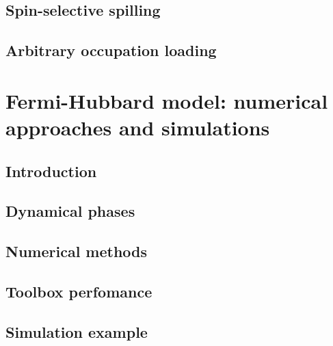 \documentclass[twoside]{article}
\begin{document}
\subsection{Spin-selective spilling} \label{subsec:spin-selective-spilling}


\subsection{Arbitrary occupation loading} \label{subsec:arbitrary-occupation-loading}



\newpage
\section{Fermi-Hubbard model: numerical approaches and simulations} \label{sec:fhmodel}

\subsection{Introduction}

\subsection{Dynamical phases}

\subsection{Numerical methods}

\subsection{Toolbox perfomance}

\subsection{Simulation example}


\newpage
\end{document}

